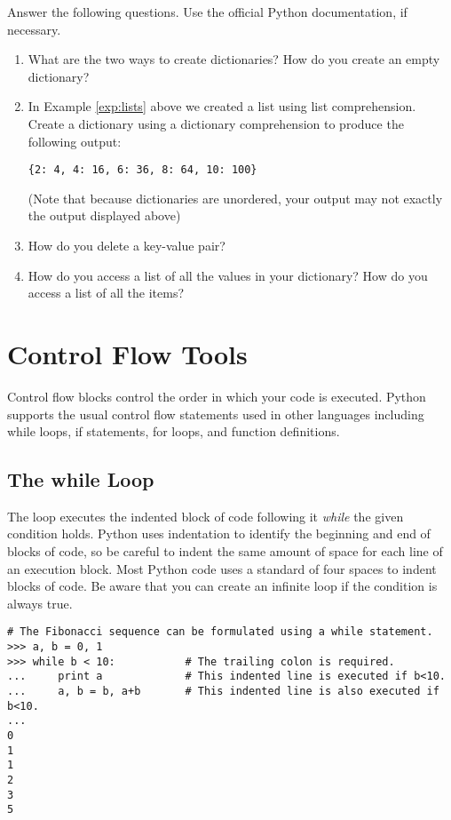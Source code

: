 \begin{problem}
Answer the following questions. Use the official Python documentation, if necessary.
\begin{enumerate}
\item What are the two ways to create dictionaries? How do you create an empty dictionary?
\item In Example \ref{exp:lists} above we created a list using list comprehension. Create a dictionary using a dictionary comprehension to produce the following output:

\begin{lstlisting}
{2: 4, 4: 16, 6: 36, 8: 64, 10: 100}
\end{lstlisting}

(Note that because dictionaries are unordered, your output may not exactly the output displayed above)
\item How do you delete a key-value pair?
\item How do you access a list of all the values in your dictionary?  
How do you access a list of all the items?
\end{enumerate}
\end{problem}


\section*{Control Flow Tools}
Control flow blocks control the order in which your code is executed.
Python supports the usual control flow statements used in other languages
including while loops, if statements, for loops, and function definitions. 

\subsection*{The while Loop}
\begin{example}
The  loop executes the indented block of code following it \emph{while} the given condition holds. Python uses indentation to identify the beginning and end of blocks of code, so be careful to indent the same amount of space for each line of an execution block.
Most Python code uses a standard of four spaces to indent blocks of code.
Be aware that you can create an infinite loop if the condition is always true.

\begin{lstlisting}
# The Fibonacci sequence can be formulated using a while statement. 
>>> a, b = 0, 1
>>> while b < 10:           # The trailing colon is required.
...     print a             # This indented line is executed if b<10.
...     a, b = b, a+b       # This indented line is also executed if b<10.
...     
0
1
1
2
3
5
\end{lstlisting}
\end{example}

